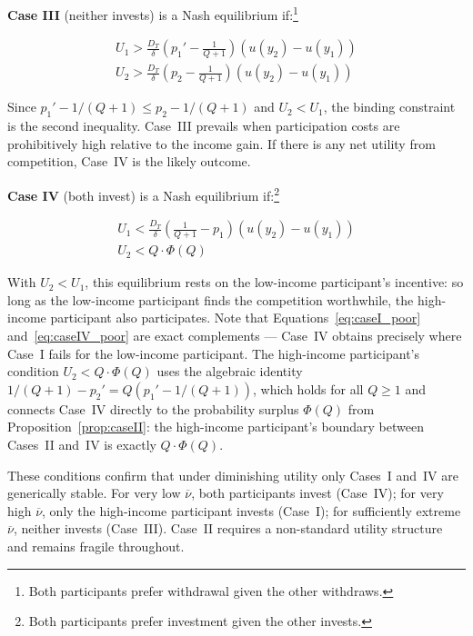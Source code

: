 \documentclass[
    oneside,
    fontsize=10pt,leqno]{article}
\begin{document}
\medskip
\noindent\textbf{Case III} (neither invests) is a Nash equilibrium if:\footnote{Both participants prefer withdrawal given the other withdraws.}

\begin{gather*}
U_{1}>\frac{D_{T}}{\delta}\left(p_{1}'-\frac{1}{Q+1}\right)(u(y_{2})-u(y_{1}))\\
U_{2}>\frac{D_{T}}{\delta}\left(p_{2}-\frac{1}{Q+1}\right)(u(y_{2})-u(y_{1}))
\end{gather*}

Since $p_{1}'-1/(Q+1)\leq p_{2}-1/(Q+1)$ and $U_{2}<U_{1}$, the
binding constraint is the second inequality. Case~III prevails when
participation costs are prohibitively high relative to the income
gain. If there is any net utility from competition, Case~IV is the
likely outcome.

\medskip
\noindent\textbf{Case IV} (both invest) is a Nash equilibrium if:\footnote{Both participants prefer investment given the other invests.}

\begin{gather}
U_{1}<\frac{D_{T}}{\delta}\left(\frac{1}{Q+1}-p_{1}\right)(u(y_{2})-u(y_{1}))\label{eq:caseIV_poor}\\
U_{2}<Q\cdot\Phi(Q)\label{eq:caseIV_rich}
\end{gather}

With $U_{2}<U_{1}$, this equilibrium rests on the low-income participant's
incentive: so long as the low-income participant finds the competition
worthwhile, the high-income participant also participates. Note that
Equations~\ref{eq:caseI_poor} and~\ref{eq:caseIV_poor} are exact
complements --- Case~IV obtains precisely where Case~I fails for
the low-income participant. The high-income participant's condition
$U_{2}<Q\cdot\Phi(Q)$ uses the algebraic identity
$1/(Q+1)-p_{2}'=Q(p_{1}'-1/(Q+1))$, which holds for all $Q\geq1$
and connects Case~IV directly to the probability surplus $\Phi(Q)$
from Proposition~\ref{prop:caseII}: the high-income participant's boundary
between Cases~II and~IV is exactly $Q\cdot\Phi(Q)$.

\medskip

These conditions confirm that under diminishing utility only Cases~I
and~IV are generically stable. For very low $\overline{\nu}$, both
participants invest (Case~IV); for very high $\overline{\nu}$, only
the high-income participant invests (Case~I); for sufficiently extreme $\overline{\nu}$,
neither invests (Case~III). Case~II requires a non-standard utility
structure and remains fragile throughout.
\end{document}
